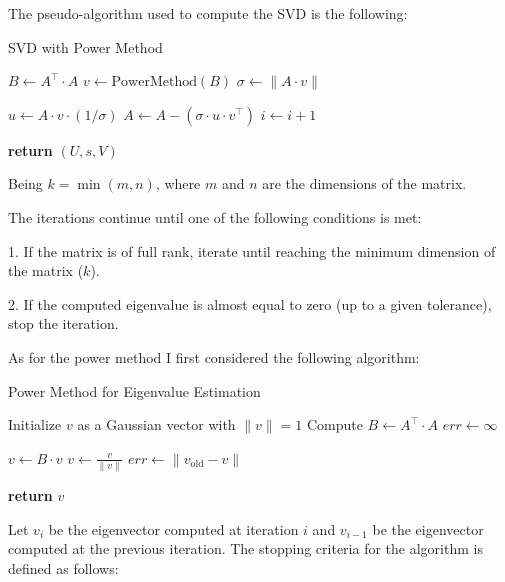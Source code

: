 \documentclass{article}
\begin{document}
\vspace{\baselineskip}
    The pseudo-algorithm used to compute the SVD is the following:

\begin{algorithm}
\caption{SVD with Power Method}
\begin{algorithmic}[3]

        \State $B \gets A^\top \cdot A$
        \State $v \gets \text{PowerMethod}(B)$
        \State $\sigma \gets \lVert A \cdot v \rVert$

        \If{$\sigma > \epsilon$}
            \State $u \gets A \cdot v \cdot (1 / \sigma)$
            \State $A \gets A - (\sigma \cdot u \cdot v^\top)$
            \State $i \gets i + 1$
        \EndIf
    \EndWhile

    \State \textbf{return} $(U, s, V)$
\EndFunction
\end{algorithmic}
\end{algorithm}

Being \( k = \min(m, n) \), where \( m \) and \( n \) are the dimensions of the matrix.

The iterations continue until one of the following conditions is met:

1. If the matrix is of full rank, iterate until reaching the minimum dimension of the matrix (\( k \)).

2. If the computed eigenvalue is almost equal to zero (up to a given tolerance), stop the iteration.

\vspace{\baselineskip}
As for the power method I first considered the following algorithm:
\begin{algorithm}
\caption{Power Method for Eigenvalue Estimation}
\begin{algorithmic}[1]
    \State Initialize $v$ as a Gaussian vector with $\|v\| = 1$
    \State Compute $B \gets A^\top \cdot A$
    \State $err \gets \infty$
    
        \State $v \gets B \cdot v$
        \State $v \gets \frac{v}{\|v\|}$
        \State $err \gets \|v_{\text{old}} - v\|$
    \EndWhile

    \State \textbf{return} $v$
\EndFunction
\end{algorithmic}
\end{algorithm}

Let \(v_i\) be the eigenvector computed at iteration \(i\) and \(v_{i-1}\) be the eigenvector computed at the previous iteration. The stopping criteria for the algorithm is defined as follows:
\end{document}
